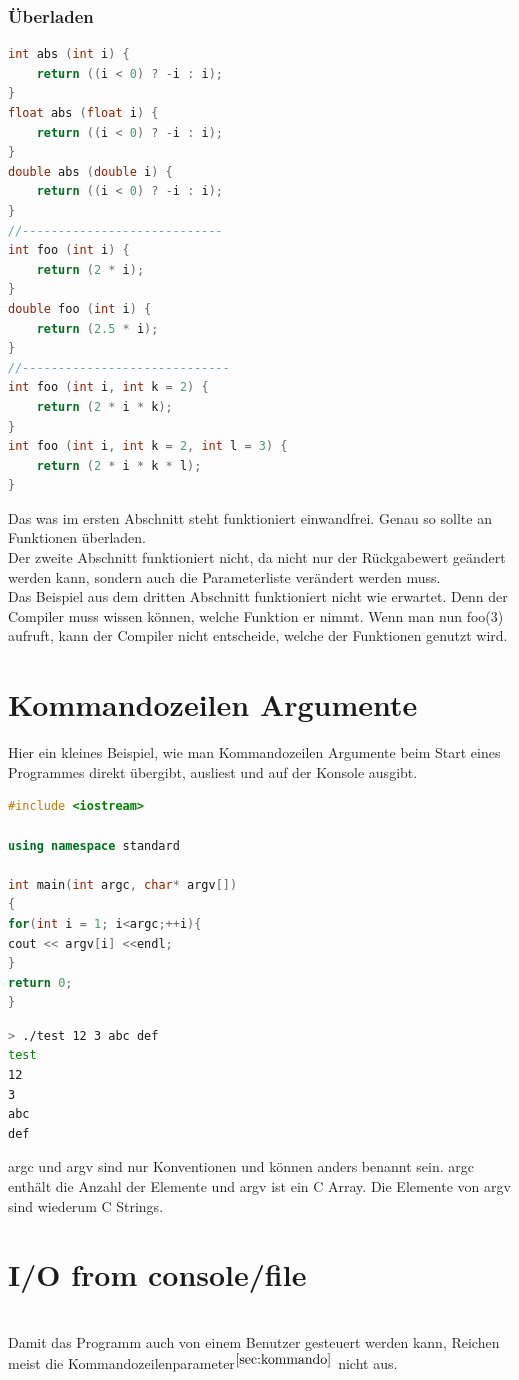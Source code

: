 \subsubsection{Überladen}
\begin{lstlisting}[language=C++]
int abs (int i) {
	return ((i < 0) ? -i : i);
}
float abs (float i) {
	return ((i < 0) ? -i : i);
}
double abs (double i) {
	return ((i < 0) ? -i : i);
}
//----------------------------
int foo (int i) {
	return (2 * i);
}
double foo (int i) {
	return (2.5 * i);
}
//-----------------------------
int foo (int i, int k = 2) {
	return (2 * i * k);
}
int foo (int i, int k = 2, int l = 3) {
	return (2 * i * k * l);
}
\end{lstlisting}
Das was im ersten Abschnitt steht funktioniert einwandfrei. Genau so sollte an Funktionen überladen.\\
Der zweite Abschnitt funktioniert nicht, da nicht nur der Rückgabewert geändert werden kann, sondern auch die Parameterliste verändert werden muss. \\ 
Das Beispiel aus dem dritten Abschnitt funktioniert nicht wie erwartet. Denn der Compiler muss wissen können, welche Funktion er nimmt. Wenn man nun foo(3) aufruft, kann der Compiler nicht entscheide, welche der Funktionen genutzt wird. 

\section{Kommandozeilen Argumente}\label{sec:kommando}
Hier ein kleines Beispiel, wie man Kommandozeilen Argumente beim Start eines Programmes direkt übergibt, ausliest und auf der Konsole ausgibt. 
\begin{lstlisting}[language=C++]
#include <iostream>

using namespace standard

int main(int argc, char* argv[])
{
for(int i = 1; i<argc;++i){
cout << argv[i] <<endl;
}
return 0;
}
\end{lstlisting}
\begin{lstlisting}[language=Bash]
> ./test 12 3 abc def
test
12
3
abc
def
\end{lstlisting}
argc und argv sind nur Konventionen und können anders benannt sein. argc enthält die Anzahl der Elemente und argv ist ein C Array. Die Elemente von argv sind wiederum C Strings.  
\section{I/O from console/file}	\qquad\\
Damit das Programm auch von einem Benutzer gesteuert werden kann, Reichen meist die Kommandozeilenparameter$^{\ref{sec:kommando}}$ nicht aus. 
